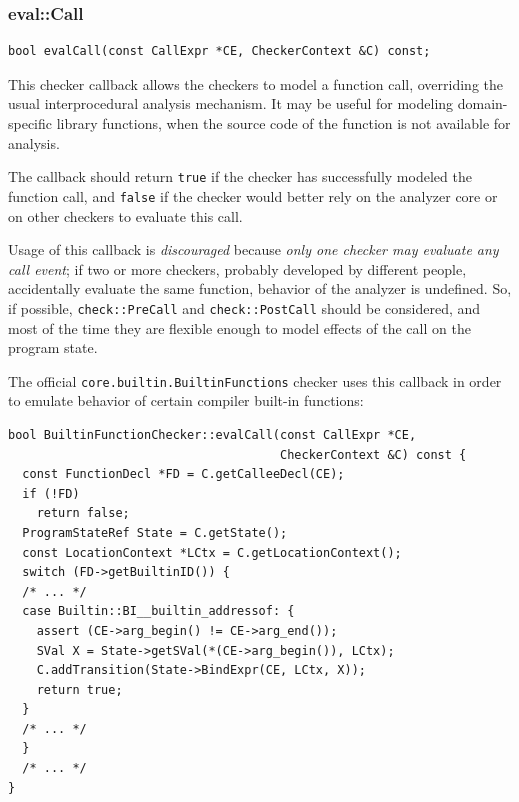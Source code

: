 \documentclass[a4paper,12pt]{article}
\newenvironment{nobr}{\begin{minipage}{\textwidth}\setlength\parskip{1em}
}{\end{minipage}\ignorespacesafterend}
\begin{document}
\begin{nobr}
\subsubsection{eval::Call}

\begin{lstlisting}[style=cplusplus,numbers=none]
bool evalCall(const CallExpr *CE, CheckerContext &C) const;
\end{lstlisting}

This checker callback allows the checkers to model a function call, overriding the usual interprocedural analysis mechanism. It may be useful for modeling domain-specific library functions, when the source code of the function is not available for analysis.
\end{nobr}

The callback should return \lstinline|true| if the checker has successfully modeled the function call, and \lstinline|false| if the checker would better rely on the analyzer core or on other checkers to evaluate this call.

Usage of this callback is \emph{discouraged} because \emph{only one checker may evaluate any call event}; if two or more checkers, probably developed by different people, accidentally evaluate the same function, behavior of the analyzer is undefined. So, if possible, \lstinline|check::PreCall| and \lstinline|check::PostCall| should be considered, and most of the time they are flexible enough to model effects of the call on the program state.

\begin{nobr}
The official \lstinline|core.builtin.BuiltinFunctions| checker uses this callback in order to emulate behavior of certain compiler built-in functions:

\begin{lstlisting}[style=cplusplus]
bool BuiltinFunctionChecker::evalCall(const CallExpr *CE,
                                      CheckerContext &C) const {
  const FunctionDecl *FD = C.getCalleeDecl(CE);
  if (!FD)
    return false;
  ProgramStateRef State = C.getState();
  const LocationContext *LCtx = C.getLocationContext();
  switch (FD->getBuiltinID()) {
  /* ... */
  case Builtin::BI__builtin_addressof: {
    assert (CE->arg_begin() != CE->arg_end());
    SVal X = State->getSVal(*(CE->arg_begin()), LCtx);
    C.addTransition(State->BindExpr(CE, LCtx, X));
    return true;
  }
  /* ... */
  }
  /* ... */
}
\end{lstlisting}
\end{nobr}
\end{document}

